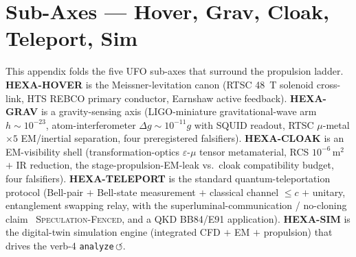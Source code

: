 \section{Sub-Axes --- Hover, Grav, Cloak, Teleport, Sim}
\label{app:subaxes}

This appendix folds the five UFO sub-axes that surround the propulsion
ladder. \textbf{HEXA-HOVER} is the Meissner-levitation canon
(RTSC \SI{48}{\tesla} solenoid cross-link, HTS REBCO primary conductor,
Earnshaw \citep{earnshaw1842} active feedback). \textbf{HEXA-GRAV} is a
gravity-sensing axis (LIGO-miniature gravitational-wave arm
$h\!\sim\!10^{-23}$, atom-interferometer $\Delta g\!\sim\!10^{-11}g$ with
SQUID readout, RTSC $\mu$-metal $\times5$ EM/inertial separation, four
preregistered falsifiers). \textbf{HEXA-CLOAK} is an EM-visibility shell
(transformation-optics $\varepsilon$-$\mu$ tensor metamaterial,
RCS $10^{-6}$\,m$^2$ $+$ IR reduction, the stage-propulsion-EM-leak vs.\
cloak compatibility budget, four falsifiers). \textbf{HEXA-TELEPORT} is
the standard quantum-teleportation protocol (Bell-pair $+$ Bell-state
measurement $+$ classical channel $\le c$ $+$ unitary, entanglement
swapping relay, with the superluminal-communication / no-cloning claim
\tierWhite\ \textsc{Speculation-Fenced}, and a QKD BB84/E91 application).
\textbf{HEXA-SIM} is the digital-twin simulation engine (integrated CFD
$+$ EM $+$ propulsion) that drives the verb-4 \texttt{analyze}\,$\circlearrowleft$.

